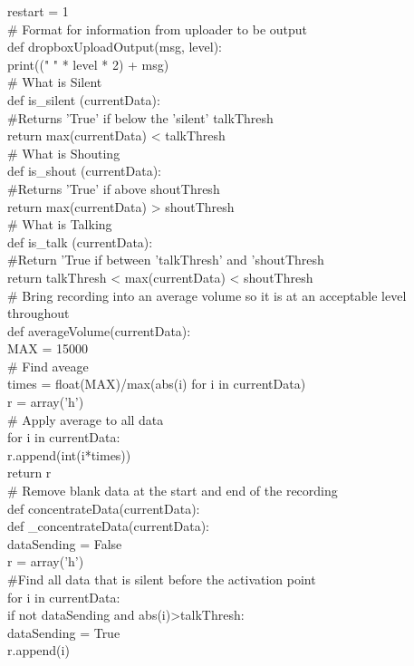 \documentclass[a4paper,11pt]{report}
\begin{document}
restart = 1\\

\# Format for information from uploader to be output\\
def dropboxUploadOutput(msg, level):\\
    print((" " * level * 2) + msg)\\

\# What is Silent\\
def is\_silent (currentData):\\
    \#Returns 'True' if below the 'silent' talkThresh\\
    return max(currentData) < talkThresh\\

\# What is Shouting\\
def is\_shout (currentData):\\
    \#Returns 'True' if above shoutThresh\\
    return max(currentData) > shoutThresh\\

\# What is Talking\\
def is\_talk (currentData):\\
    \#Return 'True if between 'talkThresh' and 'shoutThresh\\
    return talkThresh < max(currentData) < shoutThresh\\

\# Bring recording into an average volume so it is at an acceptable level throughout\\
def averageVolume(currentData):    \\
    MAX = 15000\\
    \# Find aveage\\
    times = float(MAX)/max(abs(i) for i in currentData)\\
    r = array('h')\\
    \# Apply average to all data\\
    for i in currentData:\\
        r.append(int(i*times))\\
    return r\\

\# Remove blank data at the start and end of the recording\\
def concentrateData(currentData):\\
    def \_concentrateData(currentData):\\
        dataSending = False\\
        r = array('h')\\
        \#Find all data that is silent before the activation point\\
        for i in currentData:\\
            if not dataSending and abs(i)>talkThresh:\\
                dataSending = True\\
                r.append(i)             \\
                    
\end{document}
